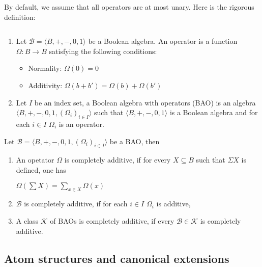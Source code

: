 \documentclass[a4paper]{article}
\theoremstyle{defin}
\theoremstyle{theorem}
\theoremstyle{claim}
\theoremstyle{prop}
\theoremstyle{lemma}
\theoremstyle{fact}
\theoremstyle{ex}
\theoremstyle{col}
\begin{document}
By default, we assume that all operators are at most unary. Here is the rigorous definition:

\begin{defin}

$ $

  \begin{enumerate}
    \item Let $\mathcal{B} = \langle B, +, -, 0, 1 \rangle$ be a Boolean algebra. An operator is a function $\Omega : B \to B$ satisfying the following conditions:
    \begin{itemize}
      \item Normality: $\Omega(0) = 0$
      \item Additivity: $\Omega(b + b') = \Omega(b) + \Omega(b')$
    \end{itemize}
    \item Let $I$ be an index set, a Boolean algebra with operators (BAO) is an algebra $\langle B, +, -, 0, 1, (\Omega_{i})_{i \in I} \rangle$ such that $\langle B, +, -, 0, 1 \rangle$ is a Boolean algebra and for each $i \in I$ $\Omega_{i}$ is an operator.
  \end{enumerate}
\end{defin}

\begin{defin} Let $\mathcal{B} = \langle B, +, -, 0, 1, (\Omega_{i})_{i \in I} \rangle$ be a BAO, then

  \begin{enumerate}
    \item An opetator $\Omega$ is completely additive, if for every $X \subseteq B$ such that $\Sigma X$ is defined, one has

    \begin{center}
      $\Omega(\sum X) = \sum \limits_{x \in X} \Omega(x)$
    \end{center}
    \item $\mathcal{B}$ is completely additive, if for each $i \in I$ $\Omega_{i}$ is additive,
    \item A class $\mathcal{K}$ of BAOs is completely additive, if every $\mathcal{B} \in \mathcal{K}$ is completely additive.
  \end{enumerate}
\end{defin}

\subsection{Atom structures and canonical extensions}
\end{document}
